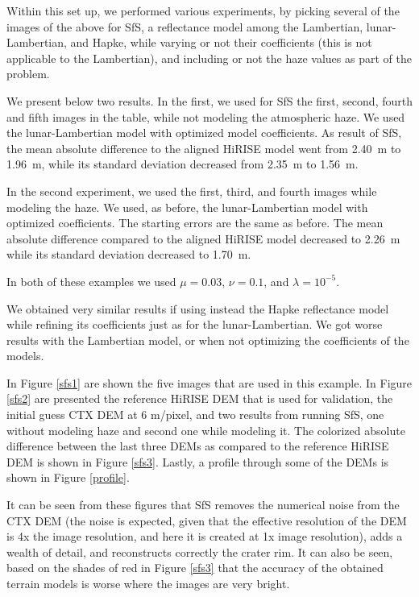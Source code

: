 \documentclass[draft,linenumbers]{agujournal}
\begin{document}
Within this set up, we performed various experiments, by picking several of the images of the above for SfS, a reflectance model among the Lambertian, lunar-Lambertian, and Hapke, while varying or not their coefficients (this is not applicable to the Lambertian), and including or not the haze values as part of the problem. 

We present below two results. In the first, we used for SfS the first, second, fourth and fifth images in the table, while not modeling the atmospheric haze. We used the lunar-Lambertian model with optimized model coefficients. As result of SfS, the mean absolute difference to the aligned HiRISE model went from 2.40~m to 1.96~m, while its standard deviation decreased from 2.35~m to 1.56~m.

In the second experiment, we used the first, third, and fourth images while modeling the haze. We used, as before, the lunar-Lambertian model with optimized coefficients. The starting errors are the same as before. The mean absolute difference compared to the aligned HiRISE model decreased to 2.26~m while its standard deviation decreased to 1.70~m. 

In both of these examples we used $\mu=0.03$, $\nu=0.1$, and $\lambda=10^{-5}.$

We obtained very similar results if using instead the Hapke reflectance model while refining its coefficients just as for the lunar-Lambertian. We got worse results with the Lambertian model, or when not optimizing the coefficients of the models. 

In Figure \ref{sfs1} are shown the five images that are used in this example. In Figure \ref{sfs2} are presented the reference HiRISE DEM that is used for validation, the initial guess CTX DEM at 6 m/pixel, and two results from running SfS, one without modeling haze and second one while modeling it. The colorized absolute difference between the last three DEMs as compared to the reference HiRISE DEM is shown in Figure \ref{sfs3}. Lastly, a profile through some of the DEMs is shown in Figure \ref{profile}. 

It can be seen from these figures that SfS removes the numerical noise from the CTX DEM (the noise is expected, given that the effective resolution of the DEM is 4x the image resolution, and here it is created at 1x image resolution), adds a wealth of detail, and reconstructs correctly the crater rim. It can also be seen, based on the shades of red in Figure \ref{sfs3} that the accuracy of the obtained terrain models is worse where the images are very bright.   
\end{document}

